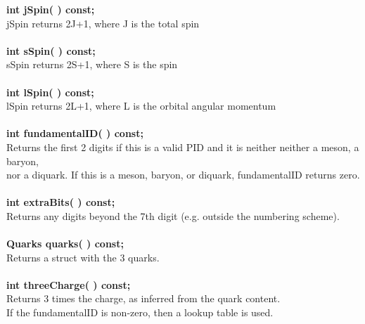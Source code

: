\begin{tabbing}
\hspace{0.5in}  {\bf int  jSpin( )        const; }\\
\hspace{0.5in}  jSpin returns 2J+1, where J is the total spin \\ \\
\hspace{0.5in}  {\bf int  sSpin( )        const; }\\
\hspace{0.5in}  sSpin returns 2S+1, where S is the spin \\ \\
\hspace{0.5in}  {\bf int  lSpin( )        const; }\\
\hspace{0.5in}  lSpin returns 2L+1, where L is the orbital angular momentum \\ \\
\hspace{0.5in}  {\bf int fundamentalID( ) const; }\\
\hspace{0.5in}  Returns the first 2 digits if this is a valid PID and it is neither
                neither a meson, a baryon, \\
\hspace{0.5in}	nor a diquark.  If this is a meson, baryon, or
		diquark, fundamentalID returns zero. \\ \\
\hspace{0.5in}  {\bf int extraBits( ) const; }\\
\hspace{0.5in}  Returns any digits beyond the 7th digit 
                (e.g. outside the numbering scheme). \\ \\
\hspace{0.5in}  {\bf Quarks quarks( ) const; }\\
\hspace{0.5in}  Returns a struct with the 3 quarks. \\ \\
\hspace{0.5in}  {\bf int threeCharge( ) const; }\\
\hspace{0.5in}  Returns 3 times the charge, as inferred from the quark content.\\
\hspace{0.5in}  If the fundamentalID is non-zero, then a lookup table is used. \\ \\

\end{tabbing}
